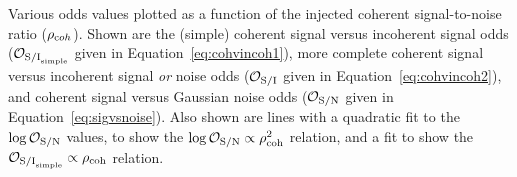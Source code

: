 \label{fig:snrvsodds}
Various odds values plotted as a function of the injected coherent signal-to-noise ratio ($\rho_{\text coh}$).
Shown are the (simple) coherent signal versus incoherent signal odds ($\mathcal{O}_{{\rm S/I}_{\rm simple}}$ given
in Equation~\ref{eq:cohvincoh1}), more complete coherent signal versus incoherent signal {\it or} noise odds
($\mathcal{O}_{\rm S/I}$ given in Equation~\ref{eq:cohvincoh2}), and coherent signal versus Gaussian noise odds
($\mathcal{O}_{\rm S/N}$ given in Equation~\ref{eq:sigvsnoise}). Also shown are lines with a quadratic fit
to the $\log{\mathcal{O}_{\rm S/N}}$ values, to show the $\log{\mathcal{O}_{\rm S/N}} \propto \rho_{\text{coh}}^2$ relation,
and a fit to show the $\mathcal{O}_{{\rm S/I}_{\rm simple}} \propto \rho_{\text{coh}}$ relation.
